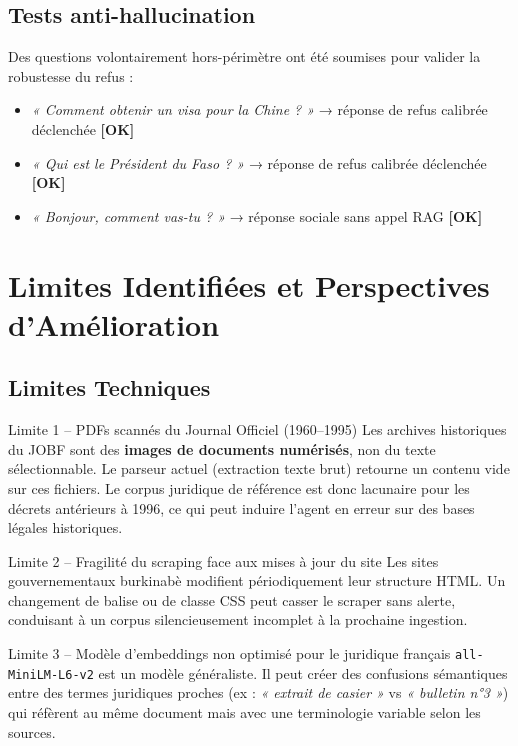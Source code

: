 \documentclass[12pt, a4paper]{article}
\begin{document}
\subsection{Tests anti-hallucination}

Des questions volontairement hors-périmètre ont été soumises pour valider la robustesse du refus :

\begin{itemize}[leftmargin=*]
  \item \emph{« Comment obtenir un visa pour la Chine ? »} → réponse de refus calibrée déclenchée \textbf{[OK]}
  \item \emph{« Qui est le Président du Faso ? »} → réponse de refus calibrée déclenchée \textbf{[OK]}
  \item \emph{« Bonjour, comment vas-tu ? »} → réponse sociale sans appel RAG \textbf{[OK]}
\end{itemize}

\section{Limites Identifiées et Perspectives d'Amélioration}

\subsection{Limites Techniques}

\begin{errorbox}{Limite 1 – PDFs scannés du Journal Officiel (1960–1995)}
Les archives historiques du JOBF sont des \textbf{images de documents numérisés}, non du texte sélectionnable. Le parseur actuel (extraction texte brut) retourne un contenu vide sur ces fichiers. Le corpus juridique de référence est donc lacunaire pour les décrets antérieurs à 1996, ce qui peut induire l'agent en erreur sur des bases légales historiques.
\end{errorbox}

\begin{errorbox}{Limite 2 – Fragilité du scraping face aux mises à jour du site}
Les sites gouvernementaux burkinabè modifient périodiquement leur structure HTML. Un changement de balise ou de classe CSS peut casser le scraper sans alerte, conduisant à un corpus silencieusement incomplet à la prochaine ingestion.
\end{errorbox}

\begin{warnbox}{Limite 3 – Modèle d'embeddings non optimisé pour le juridique français}
\texttt{all-MiniLM-L6-v2} est un modèle généraliste. Il peut créer des confusions sémantiques entre des termes juridiques proches (ex : \emph{« extrait de casier »} vs \emph{« bulletin n°3 »}) qui réfèrent au même document mais avec une terminologie variable selon les sources.
\end{warnbox}
\end{document}

